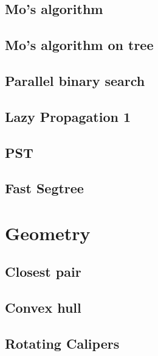 \documentclass[10pt,landscape,a4paper,twocolumn]{article}
\begin{document}
\subsection{Mo's algorithm}


\subsection{Mo's algorithm on tree}


\subsection{Parallel binary search}


\subsection{Lazy Propagation 1}


\subsection{PST}


\subsection{Fast Segtree}


\section{Geometry}
\subsection{Closest pair}


\subsection{Convex hull}


\subsection{Rotating Calipers}

\end{document}
